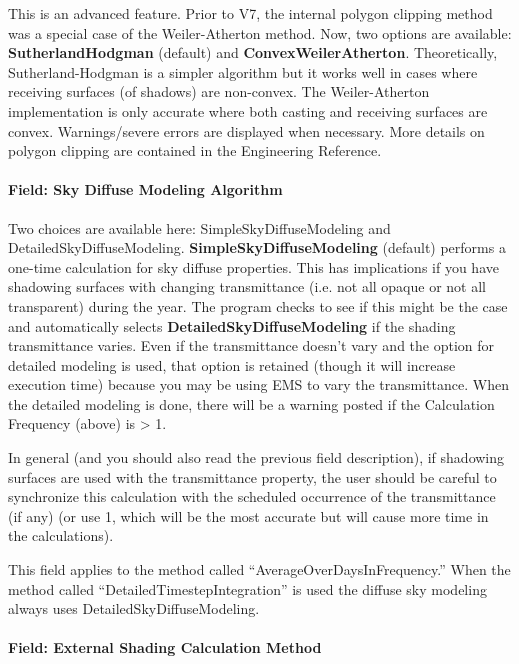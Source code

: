 This is an advanced feature. Prior to V7, the internal polygon clipping method was a special case of the Weiler-Atherton method. Now, two options are available: \textbf{SutherlandHodgman} (default) and \textbf{ConvexWeilerAtherton}. Theoretically, Sutherland-Hodgman is a simpler algorithm but it works well in cases where receiving surfaces (of shadows) are non-convex. The Weiler-Atherton implementation is only accurate where both casting and receiving surfaces are convex. Warnings/severe errors are displayed when necessary. More details on polygon clipping are contained in the Engineering Reference.

\paragraph{Field: Sky Diffuse Modeling Algorithm}\label{field-sky-diffuse-modeling-algorithm}

Two choices are available here: SimpleSkyDiffuseModeling and DetailedSkyDiffuseModeling. \textbf{SimpleSkyDiffuseModeling} (default) performs a one-time calculation for sky diffuse properties. This has implications if you have shadowing surfaces with changing transmittance (i.e. not all opaque or not all transparent) during the year. The program checks to see if this might be the case and automatically selects \textbf{DetailedSkyDiffuseModeling} if the shading transmittance varies. Even if the transmittance doesn't vary and the option for detailed modeling is used, that option is retained (though it will increase execution time) because you may be using EMS to vary the transmittance. When the detailed modeling is done, there will be a warning posted if the Calculation Frequency (above) is \textgreater{} 1.

In general (and you should also read the previous field description), if shadowing surfaces are used with the transmittance property, the user should be careful to synchronize this calculation with the scheduled occurrence of the transmittance (if any) (or use 1, which will be the most accurate but will cause more time in the calculations).

This field applies to the method called ``AverageOverDaysInFrequency.'' When the method called ``DetailedTimestepIntegration'' is used the diffuse sky modeling always uses DetailedSkyDiffuseModeling.

\paragraph{Field: External Shading Calculation Method}\label{field-external-shading-calculation-method}

